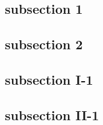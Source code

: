 \documentclass[9pt]{beamer}
\begin{document}
\Front
\overview
\subsection{subsection 1}

\subsection{subsection 2}

\subsection{subsection I-1}


\subsection{subsection II-1}

\pagestyle{empty}

\end{document}
